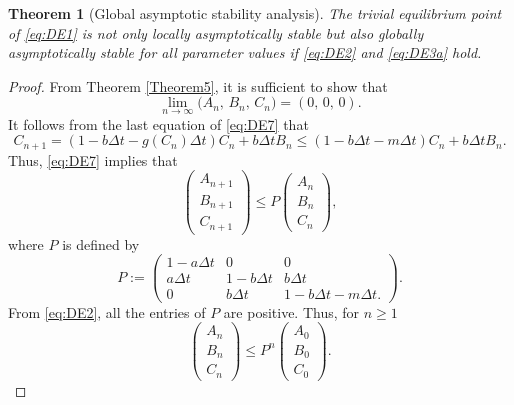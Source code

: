 \documentclass[12pt]{article}
\newtheorem{theorem}{Theorem}[section]
\theoremstyle{definition}
\theoremstyle{remark}
\numberwithin{equation}{section}
\begin{document}
{\begin{theorem}[Global asymptotic stability analysis]\label{Theorem5new}
The trivial equilibrium point of \eqref{eq:DE1} is not only locally asymptotically stable but also globally asymptotically stable for all parameter values if \eqref{eq:DE2} and \eqref{eq:DE3a} hold.
\end{theorem}
\begin{proof}
From Theorem \ref{Theorem5}, it is sufficient to show that
\begin{equation*}
\lim_{n \to \infty}\big(A_n,\,B_n,\,C_n\big) = (0,\,0,\,0).
\end{equation*}
It follows from the last equation of \eqref{eq:DE7} that
\begin{equation*}
C_{n + 1} = (1 - b\Delta t - g(C_n)\Delta t)C_n +  b\Delta t B_n \leq (1 - b\Delta t - m\Delta t)C_n +  b\Delta t B_n.
\end{equation*}
Thus, \eqref{eq:DE7} implies that
\begin{equation*}
\begin{pmatrix}
A_{n + 1}\\
B_{n + 1}\\
C_{n + 1}
\end{pmatrix}
\leq
P
\begin{pmatrix}
A_n\\
B_n\\
C_n
\end{pmatrix},
\end{equation*}
where $P$ is defined by
\begin{equation*}
P :=
\begin{pmatrix}
1 - a\Delta t&0&0\\
a\Delta t&1 - b\Delta t& b\Delta t\\
0&b\Delta t & 1 - b\Delta t - m\Delta t.
\end{pmatrix}.
\end{equation*}
From \eqref{eq:DE2}, all the entries of $P$ are positive. Thus, for $n \geq 1$
\begin{equation}\label{eq:DE8}
\begin{pmatrix}
A_n\\
B_n\\
C_n
\end{pmatrix}
\leq P^n
\begin{pmatrix}
A_0\\
B_0\\
C_0
\end{pmatrix}.
\end{equation}

\end{proof}}
\end{document}
